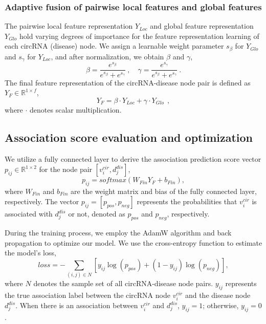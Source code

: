 \documentclass{bioinfo}
\begin{document}
\begin{methods}
\subsubsection{Adaptive fusion of pairwise local features and global features}
The pairwise local feature representation ${Y_{Loc}}$ and global feature representation ${Y_{Glo}}$ hold varying degrees of importance for the feature representation learning of each circRNA (disease) node. We assign a learnable weight parameter $s_{\beta}$ for ${Y_{Glo}}$ and $s_{\gamma}$ for ${Y_{Loc}}$, and after normalization, we obtain $\beta$ and $\gamma$,
\begin{equation}
    \beta = \frac{e^{s_{\beta}}}{e^{s_{\beta}} + e^{s_{\gamma}}}\ , \quad \gamma = \frac{e^{s_{\gamma}}}{e^{s_{\beta}} + e^{s_{\gamma}}}\ .
\end{equation}
The final feature representation of the circRNA-disease node pair is defined as ${Y}_{F} \in \mathbb{R}^{1\times f}$,
\begin{equation}
    {Y}_{F} = \beta \cdot {Y_{Loc}} + \gamma \cdot {Y_{Glo}}\ \ ,
\end{equation}
where $\cdot$ denotes scalar multiplication.

\vspace{0.3cm}


\subsection{Association score evaluation and optimization}
We utilize a fully connected layer to derive the association prediction score vector $p_{ij} \in \mathbb{R}^{1\times 2}$ for the node pair $[v_i^{cir}, d_j^{dis}]$,
\begin{equation}
    p_{ij} = softmax(W_{Fin}Y_{F} + b_{Fin}),
\end{equation}
where $W_{Fin}$ and $b_{Fin}$ are the weight matrix and bias of the fully connected layer, respectively. The vector $p_{ij} = [p_{pos}, p_{neg}]$ represents the probabilities that $v_i^{cir}$ is associated with $d_j^{dis}$ or not, denoted as $p_{pos}$ and $p_{neg}$, respectively.

During the training process, we employ the AdamW algorithm and back propagation to optimize our model. We use the cross-entropy function to estimate the model's loss,
\begin{equation}
    loss = - \sum\limits_{(i,j) \in N} \left[ y_{ij} \log (p_{pos}) + (1 - y_{ij}) \log (p_{neg}) \right],
\end{equation}
where $N$ denotes the sample set of all circRNA-disease node pairs. $y_{ij}$ represents the true association label between the circRNA node $v_i^{cir}$ and the disease node $d_j^{dis}$. When there is an association between $v_i^{cir}$ and $d_j^{dis}$, $y_{ij} = 1$; otherwise, $y_{ij} = 0$.


\end{methods}
\end{document}
